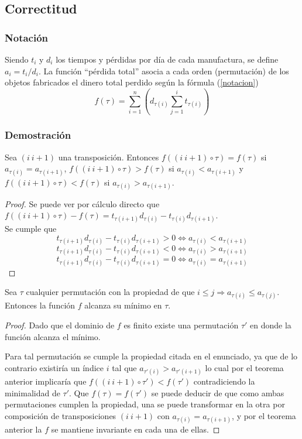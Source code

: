 \subsection{Correctitud}

\subsubsection{Notaci\'on}
Siendo $t_i$ y $d_i$ los tiempos y p\'erdidas por d\'ia de cada manufactura, se define $a_i = t_i / d_i$. La funci\'on ``p\'erdida total'' asocia a cada orden (permutaci\'on) de los objetos fabricados el dinero total perdido seg\'un la f\'ormula (\ref{notacion})
\begin{equation}
f(\tau) = \sum_{i=1}^{n}( d_{\tau(i)} \sum_{j=1}^{i} t_{\tau(i)} ) \label{notacion}
\end{equation}

\subsubsection{Demostraci\'on}
\begin{Teo}
Sea $(i \ i+1)$ una transposici\'on. Entonces $f((i \ i+1)\circ\tau) = f(\tau)$ si $a_{\tau(i)} = a_{\tau(i+1)}$, $f((i \ i+1)\circ\tau) > f(\tau)$ si $a_{\tau(i)} < a_{\tau(i+1)}$ y $f((i \ i+1)\circ\tau) < f(\tau)$ si $a_{\tau(i)} > a_{\tau(i+1)}$.
\end{Teo}
\begin{proof}

Se puede ver por c\'alculo directo que $f((i \ i+1)\circ\tau) - f(\tau) = t_{\tau(i+1)} d_{\tau(i)} - t_{\tau(i)} d_{\tau(i+1)}$.\\ Se cumple que $$ t_{\tau(i+1)} d_{\tau(i)} - t_{\tau(i)} d_{\tau(i+1)} > 0 \iff a_{\tau(i)} < a_{\tau(i+1)}$$ $$ t_{\tau(i+1)} d_{\tau(i)} - t_{\tau(i)} d_{\tau(i+1)} < 0 \iff a_{\tau(i)} > a_{\tau(i+1)}$$ $$ t_{\tau(i+1)} d_{\tau(i)} - t_{\tau(i)} d_{\tau(i+1)} = 0 \iff a_{\tau(i)} = a_{\tau(i+1)}$$
\end{proof}
\begin{Teo}
Sea $\tau$ cualquier permutaci\'on con la propiedad de que $i \leq j \Rightarrow a_{\tau (i)} \leq a_{\tau (j)}$. Entonces la funci\'on $f$ alcanza su m\'inimo en $\tau$.
\end{Teo}
\begin{proof}

Dado que el dominio de $f$ es finito existe una permutaci\'on $\tau'$ en donde la funci\'on alcanza el m\'inimo.

Para tal permutaci\'on se cumple la propiedad citada en el enunciado, ya que de lo contrario existir\'ia un \'indice $i$ tal que $a_{\tau'(i)}>a_{\tau'(i+1)}$ lo cual por el teorema anterior implicar\'ia que $f((i \ i+1)\circ\tau') < f(\tau')$ contradiciendo la minimalidad de $\tau'$.
Que $f(\tau)=f(\tau')$ se puede deducir de que como ambas permutaciones cumplen la propiedad, una se puede transformar en la otra por composici\'on de transposiciones $(i \ i+1)$ con $a_{\tau(i)} = a_{\tau(i+1)}$, y por el teorema anterior la $f$ se mantiene invariante en cada una de ellas.
\end{proof}

